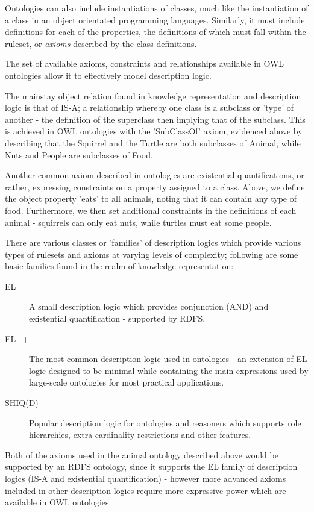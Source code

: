 \documentclass{article}
\begin{document}
Ontologies can also include instantiations of classes, much like the
instantiation of a class in an object orientated programming languages.
Similarly, it must include definitions for each of the properties, the
definitions of which must fall within the ruleset, or \emph{axioms} 
described by the class definitions.

The set of available axioms, constraints and relationships available in OWL
ontologies allow it to effectively model description logic\cite{desclogic}. 

The mainstay object relation found in knowledge representation and description
logic is that of IS-A; a relationship whereby one class is a subclass or 'type'
of another - the definition of the superclass then implying that of the
subclass. This is achieved in OWL ontologies with the 'SubClassOf' axiom,
evidenced above by describing that the Squirrel and the Turtle are both
subclasses of Animal, while Nuts and People are subclasses of Food.

Another common axiom described in ontologies are existential quantifications, or
rather, expressing constraints on a property assigned to a class. Above, we
define the object property 'eats' to all animals, noting that it can contain any
type of food. Furthermore, we then set additional constraints in the definitions
of each animal - squirrels can only eat nuts, while turtles must eat some
people.

There are various classes or 'families' of description logics which provide various 
types of rulesets and axioms at varying levels of complexity; following are some basic 
families found in the realm of knowledge representation:

\begin{description}
    \item[EL] A small description logic which provides conjunction (AND) and
    existential quantification - supported by RDFS.
    \item[EL++] The most common description logic used in ontologies - an
    extension of EL logic designed to be minimal while containing the main 
    expressions used by large-scale ontologies for most practical 
    applications.\cite{elplusplus}
    \item[SHIQ(D)] Popular description logic for ontologies and reasoners which
    supports role hierarchies, extra cardinality restrictions and other
    features. 
\end{description}

Both of the axioms used in the animal ontology described above would be
supported by an RDFS ontology, since it supports the EL family of description
logics (IS-A and existential quantification) - however more advanced axioms
included in other description logics require more expressive power which are
available in OWL ontologies.
\end{document}
